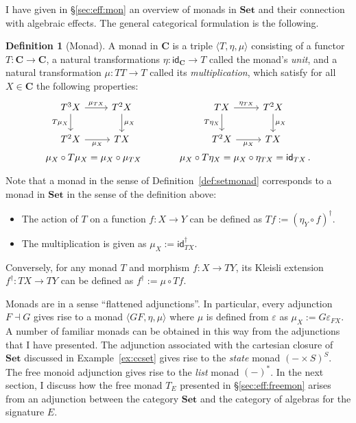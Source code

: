\documentclass[11pt,oneside]{book}
\theoremstyle{definition}
\newtheorem{definition}[theorem]{Definition}
\newcommand{\kw}[1]{\ensuremath{ \mathsf{#1} }}
\begin{document}
I have given in \S\ref{sec:eff:mon}
an overview of monads in $\mathbf{Set}$
and their connection with algebraic effects.
The general categorical formulation is the following.

\begin{definition}[Monad]
A monad in $\mathbf{C}$
is a triple $\langle T, \eta, \mu \rangle$
consisting of
a functor $T : \mathbf{C} \rightarrow \mathbf{C}$,
a natural transformations
$\eta : \kw{id}_\mathbf{C} \rightarrow T$
called the monad's \emph{unit},
and a natural transformation
$\mu : TT \rightarrow T$
called its \emph{multiplication},
which satisfy for all $X \in \mathbf{C}$
the following properties:
\[
  \begin{array}{c@{\hspace{4em}}c}
    \begin{tikzcd}
      T^3 X \ar[r, "\mu_{TX}"] \ar[d, "T \mu_X"'] &
      T^2 X \ar[d, "\mu_X"] \\
      T^2 X \ar[r, "\mu_X"'] &
      T X
    \end{tikzcd}
    &
    \begin{tikzcd}
      T X \ar[r, "\eta_{TX}"] \ar[d, "T \eta_X"'] &
      T^2 X \ar[d, "\mu_X"] \\
      T^2 X \ar[r, "\mu_X"'] &
      T X
    \end{tikzcd}
    \vspace{1ex}
    \\
    \mu_X \circ T \mu_X = \mu_X \circ \mu_{TX}
    &
    \mu_X \circ T \eta_X = \mu_X \circ \eta_{TX} = \kw{id}_{T X}
    \,.
  \end{array}
\]
\end{definition}

Note that a monad in the sense of Definition~\ref{def:setmonad}
corresponds to a monad in $\mathbf{Set}$
in the sense of the definition above:
\begin{itemize}
  \item
    The action of $T$ on a function $f : X \rightarrow Y$
    can be defined as $T f := (\eta_Y \circ f)^\dagger$.
  \item
    The multiplication is given as $\mu_X := \kw{id}_{T X}^\dagger$.
\end{itemize}
Conversely, for any monad $T$ and morphism $f : X \rightarrow TY$,
its Kleisli extension $f^\dagger : TX \rightarrow TY$ can be defined
as $f^\dagger := \mu \circ T f$.

Monads are in a sense ``flattened adjunctions''.
In particular, every adjunction $F \dashv G$ gives rise to a monad
$\langle GF, \eta, \mu \rangle$
where $\mu$ is defined from $\varepsilon$ as
$\mu_X := G \varepsilon_{F X}$.
A number of familiar monads can be obtained in this way
from the adjunctions that I have presented.
The adjunction associated with the cartesian closure of $\mathbf{Set}$
discussed in Example~\ref{ex:ccset}
gives rise to the \emph{state} monad $(- \times S)^S$.
The free monoid adjunction gives rise to
the \emph{list} monad $(-)^*$.
In the next section,
I discuss how the free monad $T_E$
presented in \S\ref{sec:eff:freemon}
arises from an adjunction between
the category $\mathbf{Set}$
and the category of algebras for the signature $E$.
\end{document}
